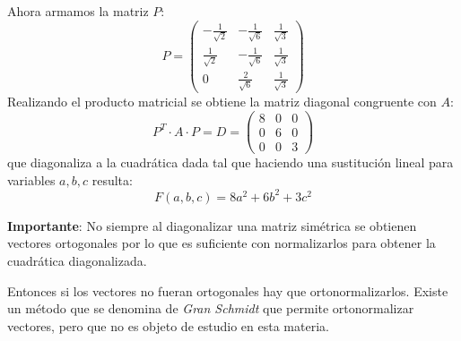 Ahora armamos la matriz \(P\):
\[
  P = \begin{pmatrix}
    -\frac{1}{\sqrt{2}} & -\frac{1}{\sqrt{6}} & \frac{1}{\sqrt{3}}\\ 
    \frac{1}{\sqrt{2}}  & -\frac{1}{\sqrt{6}} & \frac{1}{\sqrt{3}} \\ 
    0 & \frac{2}{\sqrt{6}} & \frac{1}{\sqrt{3}}
  \end{pmatrix}
\]
Realizando el producto matricial se obtiene la matriz diagonal congruente con \(A\):
\[
  P^T \cdot A \cdot P = D = \begin{pmatrix}
    8 & 0 & 0 \\
    0 & 6 & 0 \\
    0 & 0 & 3
  \end{pmatrix}
\]
que diagonaliza a la cuadrática dada tal que haciendo una sustitución lineal para variables \(a,b,c\) resulta:
\[
  F(a,b,c) = 8a^2 + 6b^2 + 3c^2
\]
\begin{tcolorbox}[mydanger]
  \textbf{Importante}: No siempre al diagonalizar una matriz simétrica se obtienen vectores ortogonales por lo que es suficiente con normalizarlos para obtener la cuadrática diagonalizada.
\end{tcolorbox}
Entonces si los vectores no fueran ortogonales hay que ortonormalizarlos. Existe un método que se denomina de \textit{Gran Schmidt} que permite ortonormalizar vectores, pero que no es objeto de estudio en esta materia.